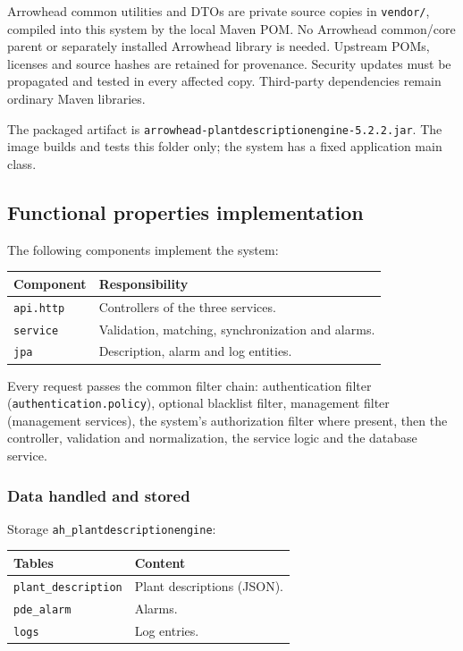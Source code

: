\documentclass[a4paper]{arrowhead}
\begin{document}
Arrowhead common utilities and DTOs are private source copies in \texttt{vendor/}, compiled into this system by the local Maven POM. No Arrowhead common/core parent or separately installed Arrowhead library is needed. Upstream POMs, licenses and source hashes are retained for provenance. Security updates must be propagated and tested in every affected copy. Third-party dependencies remain ordinary Maven libraries.

The packaged artifact is \texttt{arrowhead-\allowbreak{}plantdescriptionengine-5.2.2.jar}. The image builds and tests this folder only; the system has a fixed application main class.

\subsection{Functional properties implementation}

The following components implement the system:

\noindent\begin{longtable}{| p{5.6cm} | p{9.6cm} |} \hline
\rowcolor{gray!33} Component & Responsibility \\ \hline \endhead
\texttt{api.\allowbreak{}http} & Controllers of the three services. \\ \hline
\texttt{service} & Validation, matching, synchronization and alarms. \\ \hline
\texttt{jpa} & Description, alarm and log entities. \\ \hline
\end{longtable}

Every request passes the common filter chain: authentication filter (\texttt{authentication.\allowbreak{}policy}), optional blacklist filter, management filter (management services), the system's authorization filter where present, then the controller, validation and normalization, the service logic and the database service.

\subsubsection{Data handled and stored}

Storage \texttt{ah\_\allowbreak{}plantdescriptionengine}:

\noindent\begin{longtable}{| p{6.4cm} | p{8.8cm} |} \hline
\rowcolor{gray!33} Tables & Content \\ \hline \endhead
\texttt{plant\_\allowbreak{}description} & Plant descriptions (JSON). \\ \hline
\texttt{pde\_\allowbreak{}alarm} & Alarms. \\ \hline
\texttt{logs} & Log entries. \\ \hline
\end{longtable}
\end{document}
